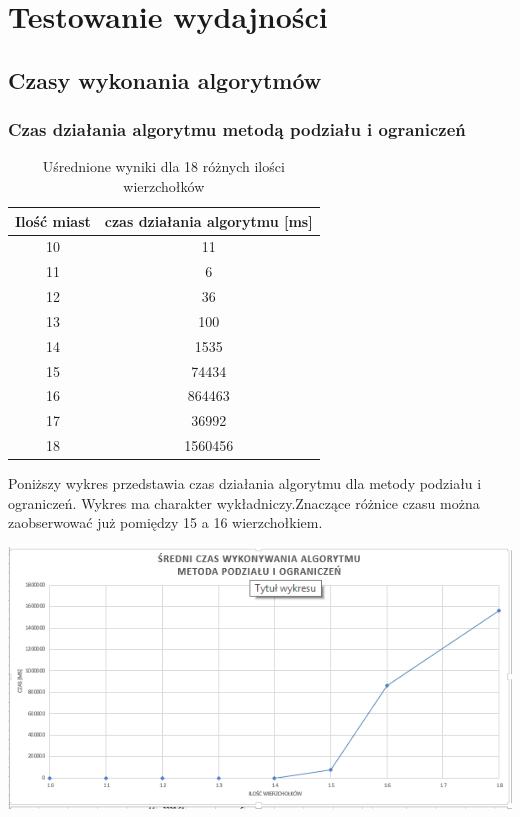 \documentclass{article}
\begin{document}
\section{Testowanie wydajności}	
	\subsection{Czasy wykonania algorytmów}
		\subsubsection{Czas działania algorytmu metodą podziału i ograniczeń}
		\begin{table}[H]
			\centering
			\caption{Uśrednione wyniki dla 18 różnych ilości wierzchołków}
			\begin{tabular}{|c|c|}
				
				\hline Ilość miast  & czas działania algorytmu [ms] \\ 
				\hline  10& 11 \\ 
				\hline  11& 6 \\ 
				\hline  12& 36\\ 
				\hline  13& 100\\ 
				\hline  14& 1535\\ 
				\hline  15& 74434\\ 
				\hline  16& 864463\\ 
				\hline  17& 36992\\ 
				\hline  18& 1560456\\ 			
				\hline 
			\end{tabular} 
		\end{table}
		
		Poniższy wykres przedstawia czas działania algorytmu dla metody podziału i ograniczeń. Wykres ma charakter wykładniczy.Znaczące różnice czasu można zaobserwować już pomiędzy 15 a 16 wierzchołkiem.
		\begin{center}
			\includegraphics[width=0.7\linewidth]{bb}
		\end{center}
	
\end{document}
